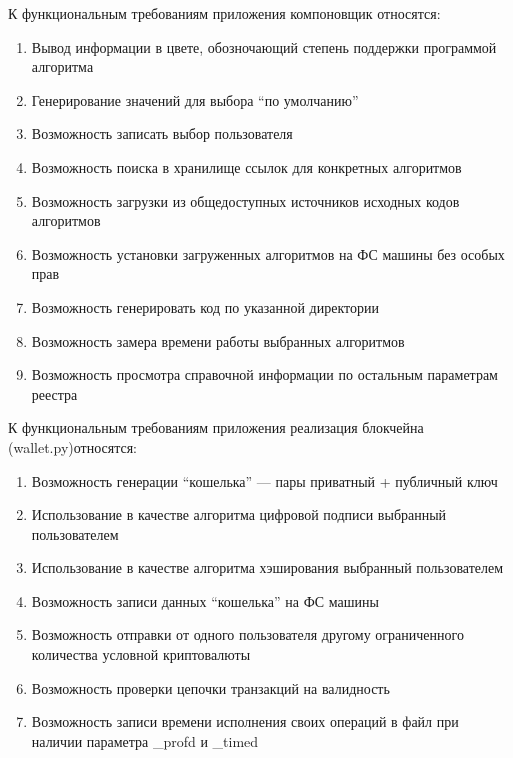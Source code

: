 К функциональным требованиям приложения компоновщик относятся:

\begin{enumerate}
    \item Вывод информации в цвете, обозночающий степень поддержки программой алгоритма
    \item Генерирование значений для выбора ``по умолчанию''
    \item Возможность записать выбор пользователя
    \item Возможность поиска в хранилище ссылок для конкретных алгоритмов
    \item Возможность загрузки из общедоступных источников исходных кодов алгоритмов
    \item Возможность установки загруженных алгоритмов на ФС машины без особых прав
    \item Возможность генерировать код по указанной директории
    \item Возможность замера времени работы выбранных алгоритмов
    \item Возможность просмотра справочной информации по остальным параметрам реестра
\end{enumerate}

К функциональным требованиям приложения реализация блокчейна ({\small wallet.py})относятся:
\begin{enumerate}
    \item Возможность генерации ``кошелька'' --- пары приватный + публичный ключ
    \item Использование в качестве алгоритма цифровой подписи выбранный пользователем
    \item Использование в качестве алгоритма хэширования выбранный пользователем
    \item Возможность записи данных ``кошелька'' на ФС машины
    \item Возможность отправки от одного пользователя другому ограниченного
          количества условной криптовалюты
    \item Возможность проверки цепочки транзакций на валидность
    \item Возможность записи времени исполнения своих операций в файл при
          наличии параметра \_profd и \_timed
\end{enumerate}

